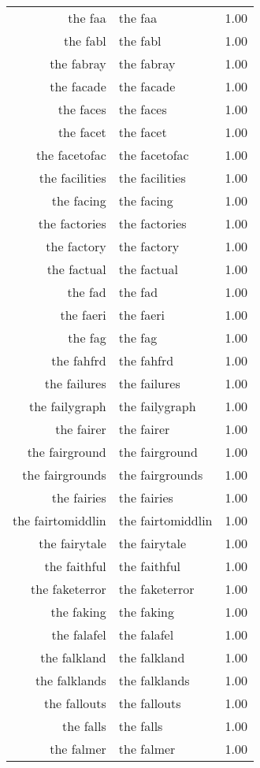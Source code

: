 \begin{table}[ht]
\begin{tabular}{rlr}
  the faa & the faa & 1.00 \\ 
  the fabl & the fabl & 1.00 \\ 
  the fabray & the fabray & 1.00 \\ 
  the facade & the facade & 1.00 \\ 
  the faces & the faces & 1.00 \\ 
  the facet & the facet & 1.00 \\ 
  the facetofac & the facetofac & 1.00 \\ 
  the facilities & the facilities & 1.00 \\ 
  the facing & the facing & 1.00 \\ 
  the factories & the factories & 1.00 \\ 
  the factory & the factory & 1.00 \\ 
  the factual & the factual & 1.00 \\ 
  the fad & the fad & 1.00 \\ 
  the faeri & the faeri & 1.00 \\ 
  the fag & the fag & 1.00 \\ 
  the fahfrd & the fahfrd & 1.00 \\ 
  the failures & the failures & 1.00 \\ 
  the failygraph & the failygraph & 1.00 \\ 
  the fairer & the fairer & 1.00 \\ 
  the fairground & the fairground & 1.00 \\ 
  the fairgrounds & the fairgrounds & 1.00 \\ 
  the fairies & the fairies & 1.00 \\ 
  the fairtomiddlin & the fairtomiddlin & 1.00 \\ 
  the fairytale & the fairytale & 1.00 \\ 
  the faithful & the faithful & 1.00 \\ 
  the faketerror & the faketerror & 1.00 \\ 
  the faking & the faking & 1.00 \\ 
  the falafel & the falafel & 1.00 \\ 
  the falkland & the falkland & 1.00 \\ 
  the falklands & the falklands & 1.00 \\ 
  the fallouts & the fallouts & 1.00 \\ 
  the falls & the falls & 1.00 \\ 
  the falmer & the falmer & 1.00 \\ 

\end{tabular}
\end{table}
